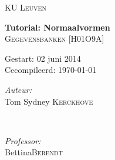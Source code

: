 \begin{titlepage}
\thispagestyle{empty}
\newcommand{\HRule}{\rule{\linewidth}{0.5mm}}
\center
\textsc{\LARGE KU Leuven}\\[1.5cm]
\vfill


{ \Huge \bfseries Tutorial: Normaalvormen}\\[0.4cm]
\textsc{\large Gegevensbanken [H01O9A]}\\[0.5cm]

\vspace{5cm}

\begin{Large}
Gestart: 02 juni 2014\\
Cecompileerd: \today\\
\end{Large}
\vspace{5cm}

\begin{minipage}{0.4\textwidth}
\begin{flushleft} \large
\emph{Auteur:}\\
Tom Sydney \textsc{Kerckhove}
\end{flushleft}
\end{minipage}
~
\begin{minipage}{0.4\textwidth}
\begin{flushright} \large
\emph{Professor:} \\
Bettina\textsc{Berendt}\\
\end{flushright}
\end{minipage}\\[4cm]

\vfill

\end{titlepage}